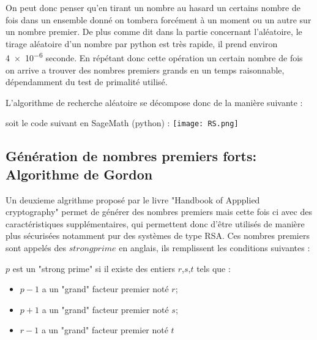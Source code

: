 \documentclass[a4paper,11pt]{article}
\begin{document}
On peut donc penser qu'en tirant un nombre au hasard un certains nombre de fois dans un ensemble donné on tombera forcément à un moment ou un autre sur un nombre premier.
De plus comme dit dans la partie concernant l'aléatoire, le tirage aléatoire d'un nombre par python est très rapide, il prend environ  \num{4e-6} seconde. En répétant donc cette opération un certain nombre de fois on arrive a trouver des nombres premiers grands en un temps raisonnable, dépendamment du test de primalité utilisé. 

L'algorithme de recherche aléatoire se décompose donc de la manière suivante : 


soit le code suivant en SageMath (python) :
\newline
\texttt{[image: RS.png]}

\subsection{Génération de nombres premiers forts: Algorithme de Gordon}

Un deuxieme algrithme proposé par le livre "Handbook of Appplied cryptography" permet de générer des nombres premiers mais cette fois ci avec des caractéristiques supplémentaires, qui permettent donc d'être utilisés de manière plus sécurisées notamment pur des systèmes de type RSA.
Ces nombres premiers sont appelés des $strong prime$ en anglais, ils remplissent les conditions suivantes : \newline

$p$ est un "strong prime" si il existe des entiers $r$,$s$,$t$ tels que :
\begin{itemize}
\item $p-1$ a un "grand" facteur premier noté $r$;
\item $p+1$ a un "grand" facteur premier noté $s$;
\item $r-1$ a un "grand" facteur premier noté $t$
\end{itemize}
\newline
\medbreak
    
    
\end{document}
